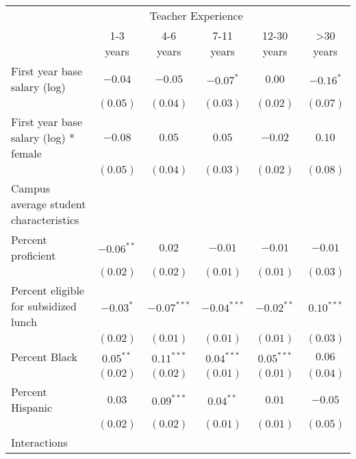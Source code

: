 \documentclass[]{article}
\begin{document}
\begin{table}
\begin{center}
\begin{tabular}{l c c c c c }
\hline
 & \multicolumn{4}{c}{Teacher Experience} \\ \cline{2-6}
 & 1-3 years & 4-6 years & 7-11 years & 12-30 years & >30 years \\
\hline
First year base salary (log)                & $-0.04$      & $-0.05$       & $-0.07^{*}$   & $0.00$       & $-0.16^{*}$  \\
                                            & $(0.05)$     & $(0.04)$      & $(0.03)$      & $(0.02)$     & $(0.07)$     \\
First year base salary (log) * female       & $-0.08$      & $0.05$        & $0.05$        & $-0.02$      & $0.10$       \\
                                            & $(0.05)$     & $(0.04)$      & $(0.03)$      & $(0.02)$     & $(0.08)$     \\
Campus average student characteristics      &              &               &               &              &              \\
\quad Percent proficient                    & $-0.06^{**}$ & $0.02$        & $-0.01$       & $-0.01$      & $-0.01$      \\
                                            & $(0.02)$     & $(0.02)$      & $(0.01)$      & $(0.01)$     & $(0.03)$     \\
\quad Percent eligible for subsidized lunch & $-0.03^{*}$  & $-0.07^{***}$ & $-0.04^{***}$ & $-0.02^{**}$ & $0.10^{***}$ \\
                                            & $(0.02)$     & $(0.01)$      & $(0.01)$      & $(0.01)$     & $(0.03)$     \\
\quad Percent Black                         & $0.05^{**}$  & $0.11^{***}$  & $0.04^{***}$  & $0.05^{***}$ & $0.06$       \\
                                            & $(0.02)$     & $(0.02)$      & $(0.01)$      & $(0.01)$     & $(0.04)$     \\
\quad Percent Hispanic                      & $0.03$       & $0.09^{***}$  & $0.04^{**}$   & $0.01$       & $-0.05$      \\
                                            & $(0.02)$     & $(0.02)$      & $(0.01)$      & $(0.01)$     & $(0.05)$     \\
Interactions                                &              &               &               &              &              \\

\end{tabular}
\end{center}
\end{table}
\end{document}
